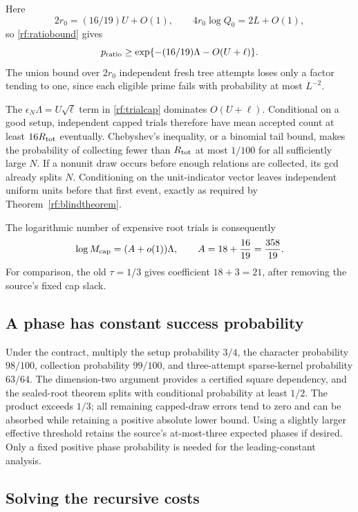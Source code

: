 Here
\[
 2r_0=(16/19)U+O(1),\qquad
 4r_0\log Q_0=2L+O(1),
\]
so \eqref{rf:ratiobound} gives
\begin{equation}
 p_{\rm ratio}\ge
 \exp\{-(16/19)\Lambda-O(U+\ell)\}.
 \label{rf:acceptance}
\end{equation}
The union bound over $2r_0$ independent fresh
tree attempts loses only a factor tending to one, since each
eligible prime fails with probability at most $L^{-2}$.

The $\epsilon_N\Lambda=U\sqrt\ell$ term in
\eqref{rf:trialcap} dominates $O(U+\ell)$.
Conditional on a good setup, independent capped trials therefore
have mean accepted count at least $16R_{\rm tot}$ eventually.
Chebyshev's inequality, or a binomial tail bound, makes the
probability of collecting fewer than $R_{\rm tot}$ at most
$1/100$ for all sufficiently large $N$.
If a nonunit draw occurs before enough relations are collected,
its gcd already splits $N$.  Conditioning on the unit-indicator
vector leaves independent uniform units before that first event,
exactly as required by Theorem~\ref{rf:blindtheorem}.

The logarithmic number of expensive root trials is consequently
\begin{equation}
 \log M_{\rm cap}=(A+o(1))\Lambda,
 \qquad A=18+\frac{16}{19}=\frac{358}{19}.
 \label{rf:A}
\end{equation}
For comparison, the old $\tau=1/3$ gives coefficient
$18+3=21$, after removing the source's fixed cap slack.

\subsection{A phase has constant success probability}

Under the contract, multiply the setup probability $3/4$, the
character probability $98/100$, collection probability $99/100$,
and three-attempt sparse-kernel probability $63/64$.
The dimension-two argument provides a certified square
dependency, and the sealed-root theorem splits with conditional
probability at least $1/2$.  The product exceeds $1/3$; all
remaining capped-draw errors tend to zero and can be absorbed
while retaining a positive absolute lower bound.  Using a slightly
larger effective threshold retains the source's at-most-three
expected phases if desired.  Only a fixed positive phase
probability is needed for the leading-constant analysis.

\subsection{Solving the recursive costs}

